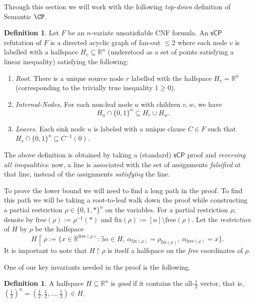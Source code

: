 \documentclass[11pt]{article}
\numberwithin{equation}{section}
\theoremstyle{definition}
\newtheorem{definition}[theorem]{Definition}
\theoremstyle{plain}
\newcounter{cor}\renewcommand{\thecor}{1.1.\arabic{cor}}\newenvironment{cor}{\ifnum\value{cor}=0\refstepcounter{cor}\else\PackageError{toc-native-compat}{Unsupported additional cor envelope}{Only the one exact source-observed cor paragraph is allowed.}\fi}{}\providecommand{\corautorefname}{Theorem}
\newcommand{\reals}{\ensuremath{\mathbb{R}}}
\newcommand{\set}[1]{\{ #1 \}}
\renewcommand{\restriction}{\!\!\upharpoonright}
\newcommand{\free}{\ensuremath{\mathrm{free}}}
\newcommand{\fix}{\ensuremath{\mathrm{fix}}}
\newcommand{\boolcube}{\ensuremath{\{0,1\}}}
\renewcommand{\restriction}{\!\ensuremath{\upharpoonright}\!}
\newcommand{\sCP}{\ensuremath{\mathsf{sCP}}}
\begin{document}
Through this section we will work with the following \emph{top-down} definition of Semantic $\CP$.
\begin{definition}
	Let $F$ be an $n$-variate unsatisfiable CNF formula.
	An $\sCP$ refutation of $F$ is a directed acyclic graph of fan-out $\leq 2$ where each node $v$ is labelled with a halfspace $H_v\subseteq \mathbb{R}^n$ (understood as a set of points satisfying a linear inequality) satisfying the following:
	\begin{enumerate}
		\item \emph{Root.} There is a unique source node $r$ labelled with the halfspace $H_v=\mathbb{R}^n$ (corresponding to the trivially true inequality $1 \geq 0$).
		\item \emph{Internal-Nodes.} For each non-leaf node $u$ with children $v, w$, we have \[H_u \cap \boolcube^n \subseteq H_v \cup H_{w}.\]
		\item \emph{Leaves.} Each sink node $u$ is labeled with a unique clause $C \in F$ such that $H_v \cap \boolcube^n \subseteq C^{-1}(0)$.
	\end{enumerate}
\end{definition}
The above definition is obtained by taking a (standard) $\sCP$ proof and \emph{reversing all inequalities}: now, a line is associated with the set of assignments \emph{falsified} at that line, instead of the assignments \emph{satisfying} the line.

To prove the lower bound we will need to find a long path in the proof.
To find this path we will be taking a root-to-leaf walk down the proof while constructing a partial restriction $\rho \in \set{0,1,*}^n$ on the variables. 
For a partial restriction $\rho$, denote by $\free(\rho) := \rho^{-1}(*)$ and $\fix(\rho):= [n] \setminus \free(\rho)$. 
Let the \emph{restriction} of $H$ by $\rho$ be the halfspace
\[H \restriction \rho := \{ x \in \reals^{\free(\rho)}: \exists \alpha \in H,~ \alpha_{\fix(\rho)} = \rho_{\fix(\rho)},~ \alpha_{\free(\rho)} = x \}. \]
It is important to note that $H \restriction \rho$ is itself a halfspace on the \emph{free} coordinates of $\rho$.

One of our key invariants needed in the proof is the following.
\begin{definition}\label{def:good-halfspace}
	A halfspace $H \subseteq \reals^n$ is \emph{good} if it contains the all-$\frac{1}{2}$ vector, that is, $(\frac{1}{2})^n=(\frac{1}{2},\frac{1}{2},\ldots,\frac{1}{2}) \in H$.
\end{definition}
%
%
\end{document}
